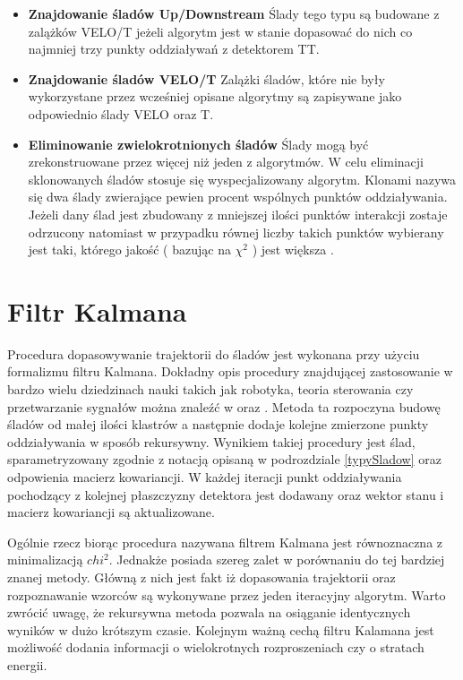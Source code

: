 \begin{itemize}
\item \textbf{Znajdowanie śladów Up/Downstream} Ślady tego typu są budowane z zalążków VELO/T jeżeli algorytm jest w stanie dopasować do nich co najmniej trzy punkty oddziaływań z detektorem TT. 
\item \textbf{Znajdowanie śladów VELO/T}  Zalążki śladów, które nie były wykorzystane przez wcześniej opisane algorytmy są zapisywane jako odpowiednio ślady VELO oraz T.
\item \textbf{Eliminowanie zwielokrotnionych śladów} Ślady mogą być zrekonstruowane przez więcej niż jeden z algorytmów. W celu eliminacji sklonowanych śladów  stosuje się wyspecjalizowany algorytm. Klonami nazywa się dwa ślady zwierające pewien procent wspólnych punktów oddziaływania. Jeżeli dany ślad jest zbudowany z mniejszej ilości punktów interakcji zostaje odrzucony natomiast w przypadku równej liczby takich punktów wybierany jest taki, którego jakość ( bazując na $\chi^2$ ) jest większa \cite{CloneTracks}. 
\end{itemize}
\section{Filtr Kalmana}
Procedura dopasowywanie trajektorii do śladów jest wykonana przy użyciu formalizmu filtru Kalmana. Dokładny opis procedury znajdującej zastosowanie w bardzo wielu dziedzinach nauki takich jak robotyka, teoria sterowania czy  przetwarzanie sygnałów można znaleźć w \cite{Kalman} oraz \cite{Kalman2}. Metoda ta rozpoczyna budowę śladów od małej ilości klastrów a następnie dodaje kolejne zmierzone punkty oddziaływania w sposób rekursywny. Wynikiem takiej procedury jest ślad, sparametryzowany zgodnie z notacją opisaną w podrozdziale \ref{typySladow} oraz odpowienia macierz kowariancji. W każdej iteracji punkt oddziaływania pochodzący z kolejnej płaszczyzny detektora jest dodawany oraz wektor stanu i macierz kowariancji są aktualizowane. 

Ogólnie rzecz biorąc procedura nazywana filtrem Kalmana jest równoznaczna z minimalizacją $chi^2$. Jednakże posiada szereg zalet w porównaniu do tej bardziej znanej metody. Główną z nich jest fakt iż dopasowania trajektorii oraz rozpoznawanie wzorców są wykonywane przez jeden iteracyjny algorytm. Warto zwrócić uwagę, że rekursywna metoda pozwala na osiąganie identycznych wyników w dużo krótszym czasie. Kolejnym ważną cechą filtru Kalamana jest możliwość dodania informacji o wielokrotnych rozproszeniach czy o stratach energii.   
